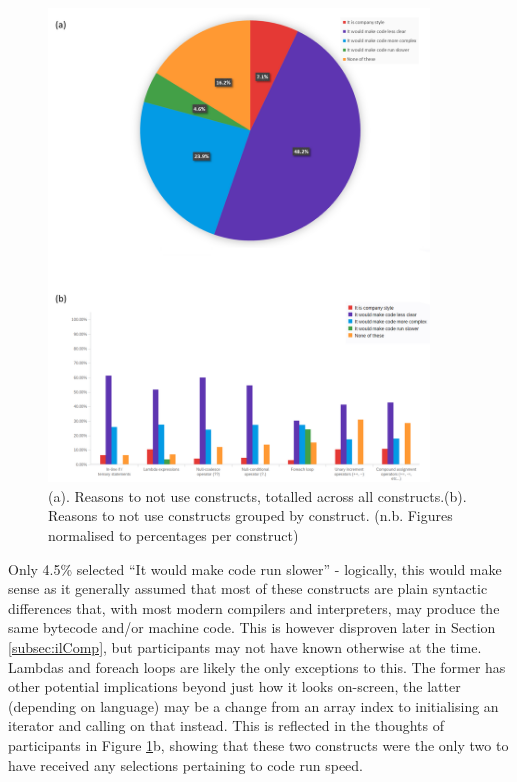 \documentclass{article}
\begin{document}
            \begin{figure}[htbp]
                \centering
                \includegraphics[width=0.9\textwidth]{toNotUse}
                \caption{(a). Reasons to not use constructs, totalled across all constructs.\newline (b). Reasons to not use constructs grouped by construct. (n.b. Figures normalised to percentages per construct)}
                \label{fig:toNotUse}
            \end{figure}

            Only 4.5\% selected ``It would make code run slower'' - logically, this would make sense as it generally assumed that most of these constructs are plain syntactic differences that, with most modern compilers and interpreters, may produce the same bytecode and/or machine code. This is however disproven later in Section \ref{subsec:ilComp}, but participants may not have known otherwise at the time. Lambdas and foreach loops are likely the only exceptions to this. The former has other potential implications beyond just how it looks on-screen, the latter (depending on language) may be a change from an array index to initialising an iterator and calling on that instead. This is reflected in the thoughts of participants in Figure \ref{fig:toNotUse}b, showing that these two constructs were the only two to have received any selections pertaining to code run speed.
\end{document}
